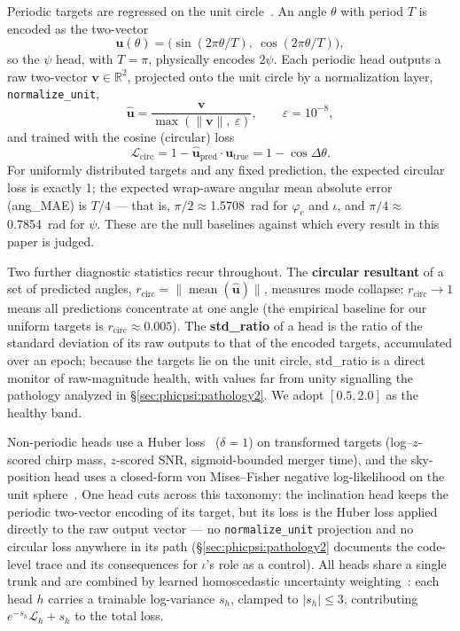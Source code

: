 Periodic targets are regressed on the unit circle~\citep{mardia2000circular}.
An angle $\theta$ with period $T$ is encoded as the two-vector
\begin{equation}
    \mathbf{u}(\theta) = \bigl(\sin(2\pi\theta/T),\ \cos(2\pi\theta/T)\bigr),
\end{equation}
so the $\psi$ head, with $T=\pi$, physically encodes $2\psi$.
Each periodic head outputs a raw two-vector $\mathbf{v} \in \mathbb{R}^2$, projected onto the unit circle by a normalization layer, \texttt{normalize\_unit},
\begin{equation}
    \hat{\mathbf{u}} = \frac{\mathbf{v}}{\max(\lVert\mathbf{v}\rVert,\ \varepsilon)},
    \qquad \varepsilon = 10^{-8},
\end{equation}
and trained with the cosine (circular) loss
\begin{equation}
    \mathcal{L}_{\mathrm{circ}}
    = 1 - \hat{\mathbf{u}}_{\mathrm{pred}} \cdot \mathbf{u}_{\mathrm{true}}
    = 1 - \cos\Delta\theta .
    \label{eq:circloss}
\end{equation}
For uniformly distributed targets and any fixed prediction, the expected circular loss is exactly 1; the expected wrap-aware angular mean absolute error (ang\_MAE) is $T/4$ --- that is, $\pi/2 \approx {}$\SI{1.5708}{\radian} for $\varphi_c$ and $\iota$, and $\pi/4 \approx {}$\SI{0.7854}{\radian} for $\psi$.
These are the null baselines against which every result in this paper is judged.

Two further diagnostic statistics recur throughout.
The \textbf{circular resultant} of a set of predicted angles, $r_{\mathrm{circ}} = \lVert \operatorname{mean}(\hat{\mathbf{u}}) \rVert$, measures mode collapse: $r_{\mathrm{circ}} \to 1$ means all predictions concentrate at one angle (the empirical baseline for our uniform targets is $r_{\mathrm{circ}} \approx 0.005$).
The \textbf{std\_ratio} of a head is the ratio of the standard deviation of its raw outputs to that of the encoded targets, accumulated over an epoch; because the targets lie on the unit circle, std\_ratio is a direct monitor of raw-magnitude health, with values far from unity signalling the pathology analyzed in \S\ref{sec:phicpsi:pathology2}.
We adopt $[0.5, 2.0]$ as the healthy band.

Non-periodic heads use a Huber loss~\citep{huber1964robust} ($\delta=1$) on transformed targets (log--$z$-scored chirp mass, $z$-scored SNR, sigmoid-bounded merger time), and the sky-position head uses a closed-form von Mises--Fisher negative log-likelihood on the unit sphere~\citep{fisher1953dispersion}.
One head cuts across this taxonomy: the inclination head keeps the periodic two-vector encoding of its target, but its loss is the Huber loss applied directly to the raw output vector --- no \texttt{normalize\_unit} projection and no circular loss anywhere in its path (\S\ref{sec:phicpsi:pathology2} documents the code-level trace and its consequences for $\iota$'s role as a control).
All heads share a single trunk and are combined by learned homoscedastic uncertainty weighting~\citep{kendall2018multi}: each head $h$ carries a trainable log-variance $s_h$, clamped to $|s_h| \le 3$, contributing $e^{-s_h}\mathcal{L}_h + s_h$ to the total loss.